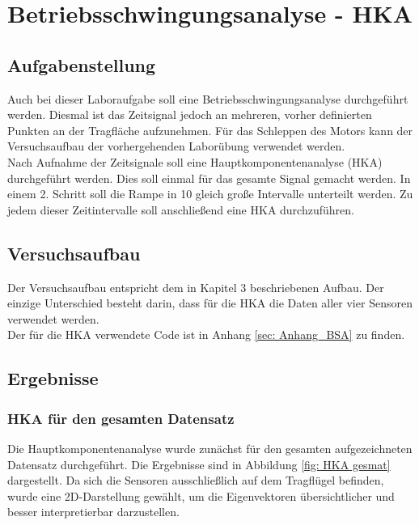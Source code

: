 \chapter{Betriebsschwingungsanalyse - HKA}
\label{sec: Hauptkapitel 3}

\section{Aufgabenstellung}
    Auch bei dieser Laboraufgabe soll eine Betriebsschwingungsanalyse
    durchgeführt werden. Diesmal ist das Zeitsignal jedoch an mehreren, vorher
    definierten Punkten an der Tragfläche aufzunehmen. Für das Schleppen des
    Motors kann der Versuchsaufbau der vorhergehenden Laborübung verwendet
    werden.
    \\

    \noindent
    Nach Aufnahme der Zeitsignale soll eine Hauptkomponentenanalyse (HKA)
    durchgeführt werden. Dies soll einmal für das gesamte Signal gemacht werden.
    In einem 2. Schritt soll die Rampe in 10 gleich große Intervalle unterteilt
    werden. Zu jedem dieser Zeitintervalle soll anschließend eine HKA
    durchzuführen.

\section{Versuchsaufbau}
    Der Versuchsaufbau entspricht dem in Kapitel 3 beschriebenen Aufbau. Der einzige 
    Unterschied besteht darin, dass für die HKA die Daten aller 
    vier Sensoren verwendet werden. 
    \\

    \noindent
    Der für die HKA verwendete Code ist in Anhang \ref{sec: Anhang_BSA} zu finden.

\section{Ergebnisse}
    \subsection{HKA für den gesamten Datensatz}
        Die Hauptkomponentenanalyse wurde zunächst für den gesamten aufgezeichneten
        Datensatz durchgeführt. Die Ergebnisse sind in Abbildung \ref{fig: HKA gesmat} dargestellt.
        Da sich die Sensoren ausschließlich auf dem Tragflügel befinden, wurde 
        eine 2D-Darstellung gewählt, um die Eigenvektoren übersichtlicher und besser 
        interpretierbar darzustellen.

